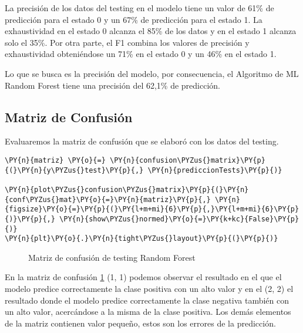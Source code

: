     La precisión de los datos del testing en el modelo tiene un valor de
61\% de predicción para el estado 0 y un 67\% de predicción para el
estado 1. La exhaustividad en el estado 0 alcanza el 85\% de los datos y
en el estado 1 alcanza solo el 35\%. Por otra parte, el F1 combina los
valores de precisión y exhaustividad obteniéndose un 71\% en el estado 0
y un 46\% en el estado 1.

Lo que se busca es la precisión del modelo, por consecuencia, el
Algoritmo de ML Random Forest tiene una precisión del
62,1\% de predicción.

    \hypertarget{matriz-de-confusiuxf3n}{%
\subsection{Matriz de Confusión}\label{matriz-de-confusiuxf3n}}

Evaluaremos la matriz de confusión que se elaboró con los datos del
testing.

    \begin{tcolorbox}[breakable, size=fbox, boxrule=1pt, pad at break*=1mm,colback=cellbackground, colframe=cellborder]
\begin{Verbatim}[commandchars=\\\{\}]
\PY{n}{matriz} \PY{o}{=} \PY{n}{confusion\PYZus{}matrix}\PY{p}{(}\PY{n}{y\PYZus{}test}\PY{p}{,} \PY{n}{prediccionTests}\PY{p}{)}

\PY{n}{plot\PYZus{}confusion\PYZus{}matrix}\PY{p}{(}\PY{n}{conf\PYZus{}mat}\PY{o}{=}\PY{n}{matriz}\PY{p}{,} \PY{n}{figsize}\PY{o}{=}\PY{p}{(}\PY{l+m+mi}{6}\PY{p}{,}\PY{l+m+mi}{6}\PY{p}{)}\PY{p}{,} \PY{n}{show\PYZus{}normed}\PY{o}{=}\PY{k+kc}{False}\PY{p}{)}
\PY{n}{plt}\PY{o}{.}\PY{n}{tight\PYZus{}layout}\PY{p}{(}\PY{p}{)}
\end{Verbatim}
\end{tcolorbox}

\begin{center}
    	\begin{figure}[H]
	\centering
	\caption{Matriz de confusión de testing Random Forest}
	\label{fig:mctrf}
	\end{figure}
\end{center}
    
    En la matriz de confusión \ref{fig:mctrf} (1, 1) podemos observar el resultado en el que
el modelo predice correctamente la clase positiva con un alto valor y en
el (2, 2) el resultado donde el modelo predice correctamente la clase
negativa también con un alto valor, acercándose a la misma de la clase
positiva. Los demás elementos de la matriz contienen valor pequeño,
estos son los errores de la predicción.

